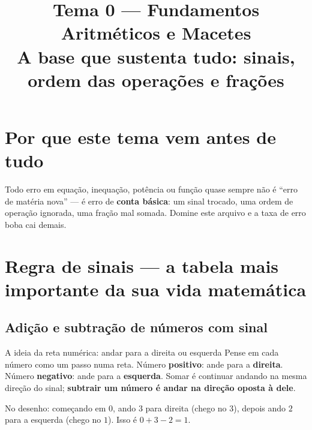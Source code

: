 \documentclass[12pt,a4paper]{article}
\title{\vspace{-1.5cm}\textbf{Tema 0 — Fundamentos Aritméticos e Macetes}\\[2pt]\large A base que sustenta tudo: sinais, ordem das operações e frações}
\author{}
\date{}
\begin{document}
\maketitle
\thispagestyle{empty}

\section*{Por que este tema vem antes de tudo}
Todo erro em equação, inequação, potência ou função quase sempre não é
``erro de matéria nova'' — é erro de \textbf{conta básica}: um sinal
trocado, uma ordem de operação ignorada, uma fração mal somada. Domine
este arquivo e a taxa de erro boba cai demais.

\section{Regra de sinais — a tabela mais importante da sua vida matemática}

\subsection{Adição e subtração de números com sinal}

\begin{dica}{A ideia da reta numérica: andar para a direita ou esquerda}
Pense em cada número como um passo numa reta. Número \textbf{positivo}:
ande para a \textbf{direita}. Número \textbf{negativo}: ande para a
\textbf{esquerda}. Somar é continuar andando na mesma direção do sinal;
\textbf{subtrair um número é andar na direção oposta à dele}.
\end{dica}

\begin{center}
\end{center}
No desenho: começando em $0$, ando $3$ para direita (chego no $3$), depois
ando $2$ para a esquerda (chego no $1$). Isso é $0+3-2=1$.
\end{document}

